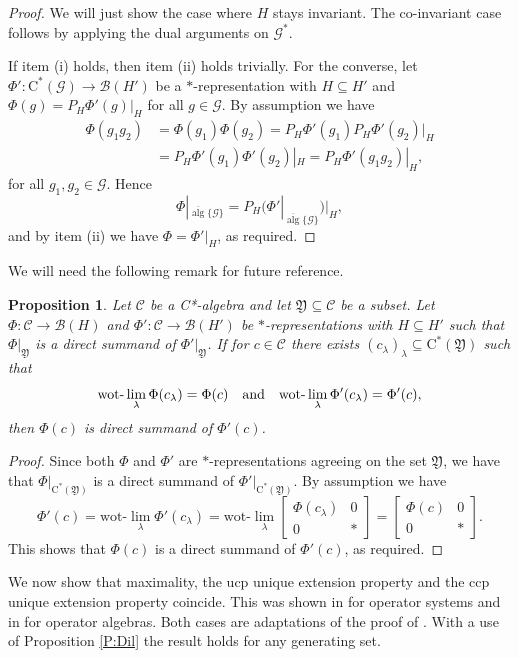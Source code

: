 \documentclass[11pt, draft]{amsart}
\numberwithin{equation}{section}
\theoremstyle{plain}
\newtheorem{proposition}[theorem]{Proposition}
\theoremstyle{definition}
\theoremstyle{remark}
\newcommand{\B}{{\mathcal{B}}}
\newcommand{\C}{{\mathcal{C}}}
\newcommand{\G}{{\mathcal{G}}}
\def\la{\lambda}
\newcommand{\fY}{{\mathfrak{Y}}}
\newcommand{\qand}{\quad\text{and}\quad}
\newcommand{\ca}{\mathrm{C}^*}
\newcommand{\ol}{\overline}
\newcommand{\alg}{\operatorname{alg}}
\begin{document}
\begin{proof}
We will just show the case where $H$ stays invariant.
The co-invariant case follows by applying the dual arguments on $\G^*$.

If item (i) holds, then item (ii) holds trivially.
For the converse, let $\Phi' \colon \ca(\G) \to \B(H')$ be a $*$-representation with $H \subseteq H'$ and $\Phi(g) = P_H \Phi'(g) |_H$ for all $g \in \G$.
By assumption we have
\begin{align*}
\Phi(g_1 g_2) 
& = \Phi(g_1) \Phi(g_2) 
= P_H \Phi'(g_1) P_H \Phi'(g_2)|_H \\
&=
P_H \Phi'(g_1) \Phi'(g_2)|_H 
= P_H \Phi'(g_1 g_2)|_H,
\end{align*}
for all $g_1, g_2 \in \G$.
Hence 
\[
\Phi|_{\ol{\alg}\{\G\}} = P_H (\Phi'|_{\ol{\alg}\{\G\}}) |_H,
\]
and by item (ii) we have $\Phi = \Phi'|_H$, as required.
\end{proof}

We will need the following remark for future reference.

\begin{proposition} \label{P:a-max}
Let $\C$ be a C*-algebra and let $\fY \subseteq \C$ be a subset.
Let $\Phi \colon \C \to \B(H)$ and $\Phi' \colon \C \to \B(H')$ be $*$-representations with $H \subseteq H'$ such that $\Phi|_{\fY}$ is a direct summand of $\Phi'|_{\fY}$.
If for $c \in \C$ there exists $(c_\la)_\la \subseteq \ca(\fY)$ such that 
\[
\textup{wot-}\lim_\la \Phi(c_\la) = \Phi(c)
\qand
\textup{wot-}\lim_\la \Phi'(c_\la) = \Phi'(c),
\]
then $\Phi(c)$ is direct summand of $\Phi'(c)$.
\end{proposition}

\begin{proof}
Since both $\Phi$ and $\Phi'$ are $*$-representations agreeing on the set $\fY$, we have that $\Phi|_{\ca(\fY)}$ is a direct summand of $\Phi'|_{\ca(\fY)}$.
By assumption we have
\[
\Phi'(c)
= \text{wot-}\lim_\la \Phi'(c_\la)
= \text{wot-}\lim_\la \begin{bmatrix} \Phi(c_\la) & 0 \\ 0 & \ast \end{bmatrix}
= \begin{bmatrix} \Phi(c) & 0 \\ 0 & \ast \end{bmatrix}.
\]
This shows that $\Phi(c)$ is a direct summand of $\Phi'(c)$, as required.
\end{proof}

We now show that maximality, the ucp unique extension property and the ccp unique extension property coincide. 
This was shown in \cite[Proposition 2.4]{Arv08} for operator systems and in \cite[Proposition 2.4]{DS18} for operator algebras. Both cases are adaptations of the proof of \cite[Theorem 2]{MS98}. 
With a use of Proposition \ref{P:Dil} the result holds for any generating set.
\end{document}
